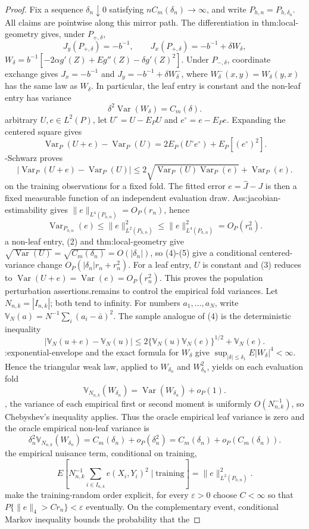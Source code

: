 \documentclass{article}
\begin{document}
\begin{proof}
Fix a sequence \(\delta_n\downarrow0\) satisfying \(nC_m(\delta_n)\to\infty\), and write \(P_{h,n}=P_{h,\delta_n}\). All claims are pointwise along this mirror path. The differentiation in thm:local-geometry gives, under \(P_{+,\delta}\),\n\[J_y(P_{+,\delta})=-b^{-1},\qquad J_x(P_{+,\delta})=-b^{-1}+\delta W_\delta,\tag{1}\]\nwhere \(W_\delta=b^{-1}[-2\alpha g'(Z)+E g''(Z)-\delta g'(Z)^2]\). Under \(P_{-,\delta}\), coordinate exchange gives \(J_x=-b^{-1}\) and \(J_y=-b^{-1}+\delta W_\delta^-\), where \(W_\delta^-(x,y)=W_\delta(y,x)\) has the same law as \(W_\delta\). In particular, the leaf entry is constant and the non-leaf entry has variance\n\[\delta^2\operatorname{Var}(W_\delta)=C_m(\delta).\tag{2}\]\n\nFor arbitrary \(U,e\in L^2(P)\), let \(U^\circ=U-E_PU\) and \(e^\circ=e-E_Pe\). Expanding the centered square gives\n\[\operatorname{Var}_P(U+e)-\operatorname{Var}_P(U)=2E_P(U^\circ e^\circ)+E_P[(e^\circ)^2].\tag{3}\]\nCauchy-Schwarz proves\n\[|\operatorname{Var}_P(U+e)-\operatorname{Var}_P(U)|\le2\sqrt{\operatorname{Var}_P(U)\operatorname{Var}_P(e)}+\operatorname{Var}_P(e).\tag{4}\]\nCondition on the training observations for a fixed fold. The fitted error \(e=\widehat J-J\) is then a fixed measurable function of an independent evaluation draw. Ass:jacobian-estimability gives \(\|e\|_{L^4(P_{h,n})}=O_P(r_n)\), hence\n\[\operatorname{Var}_{P_{h,n}}(e)\le\|e\|_{L^2(P_{h,n})}^2\le\|e\|_{L^4(P_{h,n})}^2=O_P(r_n^2).\tag{5}\]\nFor a non-leaf entry, (2) and thm:local-geometry give \(\sqrt{\operatorname{Var}(U)}=\sqrt{C_m(\delta_n)}=O(|\delta_n|)\), so (4)-(5) give a conditional centered-variance change \(O_P(|\delta_n|r_n+r_n^2)\). For a leaf entry, \(U\) is constant and (3) reduces to \(\operatorname{Var}(U+e)=\operatorname{Var}(e)=O_P(r_n^2)\). This proves the population perturbation assertions.\n\nIt remains to control the empirical fold variances. Let \(N_{n,k}=|I_{n,k}|\); both tend to infinity. For numbers \(a_1,\ldots,a_N\), write \(\mathbb V_N(a)=N^{-1}\sum_i(a_i-\bar a)^2\). The sample analogue of (4) is the deterministic inequality\n\[|\mathbb V_N(u+e)-\mathbb V_N(u)|\le2\{\mathbb V_N(u)\mathbb V_N(e)\}^{1/2}+\mathbb V_N(e).\tag{6}\]\nAss:exponential-envelope and the exact formula for \(W_\delta\) give \(\sup_{|\delta|\le\delta_1}E|W_\delta|^4<\infty\). Hence the triangular weak law, applied to \(W_{\delta_n}\) and \(W_{\delta_n}^2\), yields on each evaluation fold\n\[\mathbb V_{N_{n,k}}(W_{\delta_n})=\operatorname{Var}(W_{\delta_n})+o_P(1).\tag{7}\]\nIndeed, the variance of each empirical first or second moment is uniformly \(O(N_{n,k}^{-1})\), so Chebyshev's inequality applies. Thus the oracle empirical leaf variance is zero and the oracle empirical non-leaf variance is\n\[\delta_n^2\mathbb V_{N_{n,k}}(W_{\delta_n})=C_m(\delta_n)+o_P(\delta_n^2)=C_m(\delta_n)+o_P(C_m(\delta_n)).\tag{8}\]\nFor the empirical nuisance term, conditional on training,\n\[E\left[N_{n,k}^{-1}\sum_{i\in I_{n,k}}e(X_i,Y_i)^2\mid\text{training}\right]=\|e\|_{L^2(P_{h,n})}^2.\tag{9}\]\nTo make the training-random order explicit, for every \(\varepsilon>0\) choose \(C<\infty\) so that \(P\{\|e\|_4>Cr_n\}<\varepsilon\) eventually. On the complementary event, conditional Markov inequality bounds the probability that the 
\end{proof}
\end{document}
